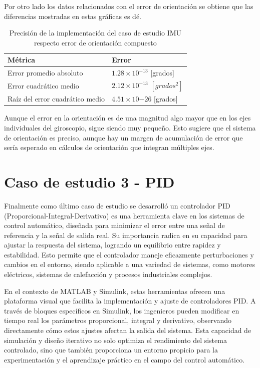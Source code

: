 Por otro lado los datos relacionados con el error de orientación se obtiene que las diferencias mostradas en estas gráficas es dé.

\begin{table}[htbp!]
    \centering
    \caption{Precisión de la implementación del caso de estudio IMU respecto error de orientación compuesto}
    \label{tab:filter-errorzgrad}
    \begin{tabular}{ll}
    Métrica                       & Error \\ \hline
    Error promedio absoluto         &   $1.28 \times 10^{-13}$ [grados]\\
    Error cuadrático medio          &   $2.12 \times 10^{-13}$ $[grados^{2}]$    \\
    Raíz del error cuadrático medio &   $4.51 \times 10{-26}$ [grados]  
    \end{tabular}
    \end{table}


Aunque el error en la orientación es de una magnitud algo mayor que en los ejes individuales del giroscopio, sigue siendo muy pequeño. Esto sugiere que el sistema de orientación es preciso, aunque hay un margen de acumulación de error que sería esperado en cálculos de orientación que integran múltiples ejes. 

\newpage

\section{Caso de estudio 3 - PID}

Finalmente como último caso de estudio se desarrolló un controlador PID (Proporcional-Integral-Derivativo) es una herramienta clave en los sistemas de control automático, diseñada para minimizar el error entre una señal de referencia y la señal de salida real. Su importancia radica en su capacidad para ajustar la respuesta del sistema, logrando un equilibrio entre rapidez y estabilidad. Esto permite que el controlador maneje eficazmente perturbaciones y cambios en el entorno, siendo aplicable a una variedad de sistemas, como motores eléctricos, sistemas de calefacción y procesos industriales complejos.

En el contexto de MATLAB y Simulink, estas herramientas ofrecen una plataforma visual que facilita la implementación y ajuste de controladores PID. A través de bloques específicos en Simulink, los ingenieros pueden modificar en tiempo real los parámetros proporcional, integral y derivativo, observando directamente cómo estos ajustes afectan la salida del sistema. Esta capacidad de simulación y diseño iterativo no solo optimiza el rendimiento del sistema controlado, sino que también proporciona un entorno propicio para la experimentación y el aprendizaje práctico en el campo del control automático.



